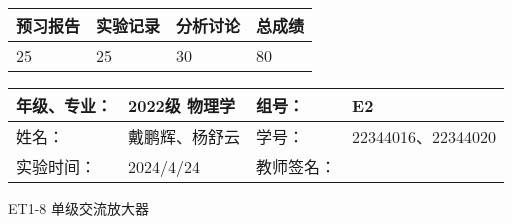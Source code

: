 \documentclass[dvipsnames, svgnames,a4paper,11pt]{article}
\begin{document}
	
	
	
	
	\begin{table}
		\renewcommand\arraystretch{1.7}
		\begin{tabularx}{\textwidth}{
				|X|X|X|X
				|X|X|X|X|}
			\hline
			\multicolumn{2}{|c|}{预习报告}&\multicolumn{2}{|c|}{实验记录}&\multicolumn{2}{|c|}{分析讨论}&\multicolumn{2}{|c|}{总成绩}\\
			\hline
			\LARGE25 & & \LARGE25 & & \LARGE30 & & \LARGE80 & \\
			\hline
		\end{tabularx}
	\end{table}
	
	\begin{table}
		\renewcommand\arraystretch{1.7}
		\begin{tabularx}{\textwidth}{|X|X|X|X|}
			\hline
			年级、专业： & 2022级 物理学 &组号： & E2\\
			\hline
			姓名： & 戴鹏辉、杨舒云  & 学号： & 22344016、22344020\\
			\hline
			实验时间： & 2024/4/24 & 教师签名： & \\
			\hline
		\end{tabularx}
	\end{table}
	
	\begin{center}
		\LARGE ET1-8 \quad 单级交流放大器
	\end{center}
	
	
\end{document}
